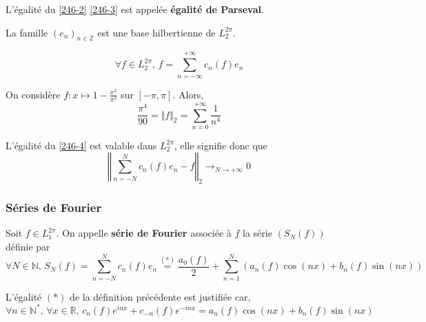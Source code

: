   \begin{remark}
    L'égalité du \cref{246-2} \cref{246-3} est appelée \textbf{égalité de Parseval}.
  \end{remark}


  \begin{theorem}
    La famille $(e_n)_{n \in \mathbb{Z}}$ est une base hilbertienne de $L_2^{2 \pi}$.
  \end{theorem}

  \begin{corollary}
    \label{246-4}
    \[ \forall f \in L_2^{2 \pi}, \, f = \sum_{n = -\infty}^{+\infty} c_n(f) e_n \]
  \end{corollary}


  \begin{example}
    \label{246-5}
    On considère $f : x \mapsto 1 - \frac{x^2}{\pi^2}$ sur $[-\pi, \pi]$. Alors,
    \[ \frac{\pi^4}{90} = \Vert f \Vert_2 = \sum_{n=0}^{+\infty} \frac{1}{n^4} \]
  \end{example}


  \begin{remark}
    L'égalité du \cref{246-4} est valable dans $L_2^{2\pi}$, elle signifie donc que
    \[ \left\Vert \sum_{n = -N}^{N} c_n(f) e_n - f \right\Vert_2 \longrightarrow_{N \rightarrow +\infty} 0 \]
  \end{remark}

  \subsubsection{Séries de Fourier}


  \begin{definition}
    Soit $f \in L_1^{2\pi}$. On appelle \textbf{série de Fourier} associée à $f$ la série $(S_N(f))$ définie par
    \[ \forall N \in \mathbb{N}, \, S_N(f) = \sum_{n=-N}^{N} c_n(f) e_n \overset{(*)}{=} \frac{a_0(f)}{2} + \sum_{n = 1}^N (a_n(f) \cos(nx) + b_n(f) \sin(nx)) \]
  \end{definition}

  \begin{remark}
    L'égalité $(*)$ de la définition précédente est justifiée car,
    \[ \forall n \in \mathbb{N}^*, \, \forall x \in \mathbb{R}, \, c_n(f) e^{inx} + c_{-n}(f) e^{-inx} = a_n(f) \cos(nx) + b_n(f) \sin(nx) \]
  \end{remark}

